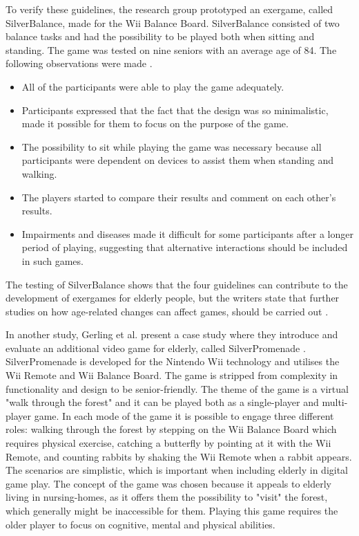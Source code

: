 To verify these guidelines, the research group prototyped an exergame, called SilverBalance, made for the Wii Balance Board. SilverBalance consisted of two balance tasks and had the possibility to be played both when sitting and standing. The game was tested on nine seniors with an average age of 84. The following observations were made \cite{gerling1}.
\begin{itemize}
\item All of the participants were able to play the game adequately. 
\item Participants expressed that the fact that the design was so minimalistic, made it possible for them to focus on the purpose of the game. 
\item The possibility to sit while playing the game was necessary because all participants were dependent on devices to assist them when standing and walking.
\item The players started to compare their results and comment on each other's results.
\item Impairments and diseases made it difficult for some participants after a longer period of playing, suggesting that alternative interactions should be included in such games.
\end{itemize}

The testing of SilverBalance shows that the four guidelines can contribute to the development of exergames for elderly people, but the writers state that further studies on how age-related changes can affect games, should be carried out \cite{gerling1}.

In another study, Gerling et al. present a case study where they introduce and evaluate an additional video game for elderly, called SilverPromenade \cite{gerling2}.  SilverPromenade is developed for the Nintendo Wii technology and utilises the Wii Remote and Wii Balance Board. The game is stripped from complexity in functionality and design to be senior-friendly. The theme of the game is a virtual "walk through the forest" and it can be played both as a single-player and multi-player game. In each mode of the game it is possible to engage three different roles: walking through the forest by stepping on the Wii Balance Board which requires physical exercise, catching a butterfly by pointing at it with the Wii Remote, and counting rabbits by shaking the Wii Remote when a rabbit appears. The scenarios are simplistic, which is important when including elderly in digital game play. The concept of the game was chosen because it appeals to elderly living in nursing-homes, as it offers them the possibility to "visit" the forest, which generally might be inaccessible for them. Playing this game requires the older player to focus on cognitive, mental and physical abilities. 

